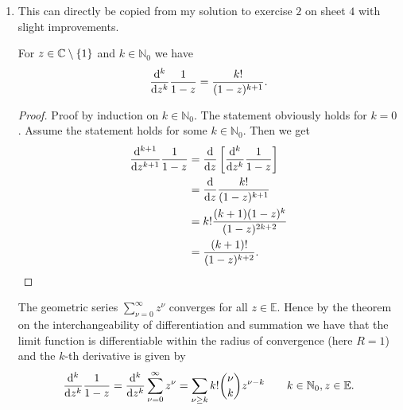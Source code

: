 \begin{enumerate}[label = \textbf{Exercise \arabic*.},wide = 0pt, itemsep=1.5ex]
\begin{enumerate}[label = (\alph*),wide = 0pt, itemsep=1.5ex]
			\item This can directly be copied from my solution to exercise $2$ on sheet $4$ with slight improvements.
				\begin{lemma}
					For $z \in \mathbb{C} \setminus \cbr[0]{1}$ and $k \in \mathbb{N}_0$ we have 
		\begin{equation}
			\frac{\mathop{}\!\mathrm{d}^k}{\mathop{}\!\mathrm{d} z^k} \frac{1}{1 - z} = \frac{k!}{(1 - z)^{k + 1}}.
		\end{equation}
		\label{lem:ind}
	\end{lemma}

	\begin{proof}
		Proof by induction on $k \in \mathbb{N}_0$. The statement obviously holds for $k = 0$. Assume the statement holds for some $k \in \mathbb{N}_0$. Then we get
		\begin{align*}
			\frac{\d^{k+1}}{\d z^{k+1}} \frac{1}{1 - z} &= \frac{\d}{\d z} \sbr[3]{\frac{\d^k}{\d z^k} \frac{1}{1 - z}}\\
			&= \frac{\d}{\d z} \frac{k!}{(1 - z)^{k + 1}}\\
			&= k!\frac{(k + 1)(1 - z)^k}{(1 - z)^{2k + 2}}\\
			&= \frac{(k + 1)!}{(1 - z)^{k + 2}}.
		\end{align*}
	\end{proof}

	The geometric series $\sum_{\nu = 0}^\infty z^\nu$ converges for all $z \in \mathbb{E}$. Hence by the theorem on the interchangeability of differentiation and summation \cite[110]{remmert2002funktionentheorie} we have that the limit function is differentiable within the radius of convergence (here $R = 1$) and the $k$-th derivative is given by
	\begin{equation}
		\frac{\mathop{}\!\mathrm{d}^k}{\mathop{}\!\mathrm{d} z^k}\frac{1}{1 - z} = \frac{\mathop{}\!\mathrm{d}^k}{\mathop{}\!\mathrm{d} z^k} \sum_{\nu = 0}^\infty z^\nu = \sum_{\nu \geq k} k! {\nu \choose k} z^{\nu - k} \qquad k\in \mathbb{N}_0, z \in \mathbb{E}.
	\end{equation}
 		\end{enumerate}
\end{enumerate}
\printbibliography

